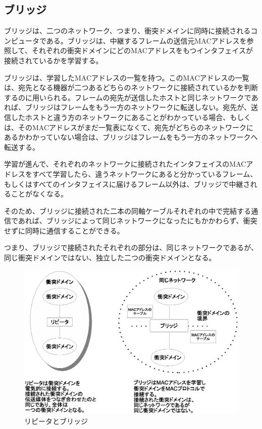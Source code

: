 \subsection{ブリッジ}

ブリッジは、二つのネットワーク、つまり、衝突ドメインに同時に接続されるコンピュータである。ブリッジは、中継するフレームの送信元MACアドレスを参照して、それぞれの衝突ドメインにどのMACアドレスをもつインタフェイスが接続されているかを学習する。

ブリッジは、学習したMACアドレスの一覧を持つ。このMACアドレスの一覧は、宛先となる機器が二つあるどちらのネットワークに接続されているかを判断するのに用いられる。フレームの宛先が送信したホストと同じネットワークであれば、ブリッジはフレームをもう一方のネットワークに転送しない。宛先が、送信したホストと違う方のネットワークにあることがわかっている場合、もしくは、そのMACアドレスがまだ一覧表になくて、宛先がどちらのネットワークにあるかわかっていない場合は、ブリッジはフレームをもう一方のネットワークへ転送する。

学習が進んで、それぞれのネットワークに接続されたインタフェイスのMACアドレスをすべて学習したら、違うネットワークにあると分かっているフレーム、もしくはすべてのインタフェイスに届けるフレーム以外は、ブリッジで中継されることがなくなる。

そのため、ブリッジに接続された二本の同軸ケーブルそれぞれの中で完結する通信であれば、ブリッジによって同じネットワークになったにもかかわらず、衝突せずに同時に通信することができる。

つまり、ブリッジで接続されたそれぞれの部分は、同じネットワークであるが、同じ衝突ドメインではない、独立した二つの衝突ドメインとなる。

\begin{figure}[htbp]
	\includegraphics[width=12cm,clip]{draw/repeaterbridge.eps}
	\caption{リピータとブリッジ}
	\label{fig:repeaterbridge}
\end{figure}

